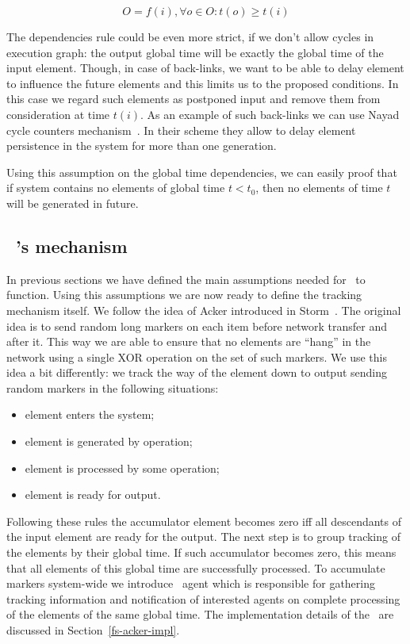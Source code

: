 \begin{equation}
    O = f(i), \forall o \in O: t(o) \ge t(i)
\end{equation}

The dependencies rule could be even more strict, if we don't allow cycles in execution graph: the output global time will be exactly the global time of the input element. Though, in case of back-links, we want to be able to delay element to influence the future elements and this limits us to the proposed conditions. In this case we regard such elements as postponed input and remove them from consideration at time $t(i)$. As an example of such back-links we can use Nayad cycle counters mechanism~\cite{Murray:2013:NTD:2517349.2522738}. In their scheme they allow to delay element persistence in the system for more than one generation.

Using this assumption on the global time dependencies, we can easily proof that if system contains no elements of global time $t < t_0$, then no elements of time $t$ will be generated in future.

\subsection{\tracker\ 's mechanism} \label{tracker_mechanism}
In previous sections we have defined the main assumptions needed for \tracker\ to function. Using this assumptions we are now ready to define the tracking mechanism itself. We follow the idea of Acker introduced in Storm~\cite{Toshniwal:2014:STO:2588555.2595641}. The original idea is to send random long markers on each item before network transfer and after it. This way we are able to ensure that no elements are ``hang'' in the network using a single XOR operation on the set of such markers. We use this idea a bit differently: we track the way of the element down to output sending random markers in the following situations:
\begin{itemize}
    \item element enters the system;
    \item element is generated by operation;
    \item element is processed by some operation;
    \item element is ready for output.
\end{itemize}
Following these rules the accumulator element becomes zero iff all descendants of the input element are ready for the output. The next step is to group tracking of the elements by their global time. If such accumulator becomes zero, this means that all elements of this global time are successfully processed. To accumulate markers system-wide we introduce \tracker\ agent which is responsible for gathering tracking information and notification of interested agents on complete processing of the elements of the same global time. The implementation details of the \tracker\ are discussed in Section~\ref{fs-acker-impl}.

